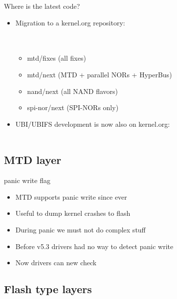 \documentclass[aspectratio=169,obeyspaces,spaces,hyphens,dvipsnames]{beamer}
\begin{document}
\begin{frame}{Where is the latest code?}
  \begin{itemize}
  \item Migration to a kernel.org repository:\\
    \sout{}\\
    \\
    \begin{itemize}
    \item mtd/fixes (all fixes)
    \item mtd/next (MTD + parallel NORs + HyperBus)
    \item nand/next (all NAND flavors)
    \item spi-nor/next (SPI-NORs only)
    \end{itemize}
    \vfill
  \item UBI/UBIFS development is now also on kernel.org:\\
    \\
  \end{itemize}
\end{frame}

\subsection{MTD layer}

\begin{frame}{panic write flag}
  \begin{itemize}
  \item MTD supports panic write since ever
  \item Useful to dump kernel crashes to flash
  \item During panic we must not do complex stuff
  \item Before v5.3 drivers had no way to detect panic write
  \item Now drivers can new check 
  \end{itemize}
\end{frame}

\subsection{Flash type layers}
\end{document}
